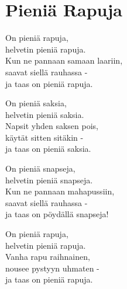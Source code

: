 \section{Pieniä Rapuja}

On pieniä rapuja,\\
helvetin pieniä rapuja.\\
Kun ne pannaan samaan laariin,\\ 
saavat siellä rauhassa -\\
ja taas on pieniä rapuja. 

On pieniä saksia,\\
helvetin pieniä saksia.\\
Napsit yhden saksen pois,\\
käytät sitten sitäkin -\\
ja taas on pieniä saksia.

On pieniä snapseja,\\
helvetin pieniä snapseja.\\
Kun ne pannaan mahapussiin,\\
saavat siellä rauhassa -\\
ja taas on pöydällä snapseja!

On pieniä rapuja,\\
helvetin pieniä rapuja.\\
Vanha rapu raihnainen,\\
nousee pystyyn uhmaten -\\
ja taas on pieniä rapuja.